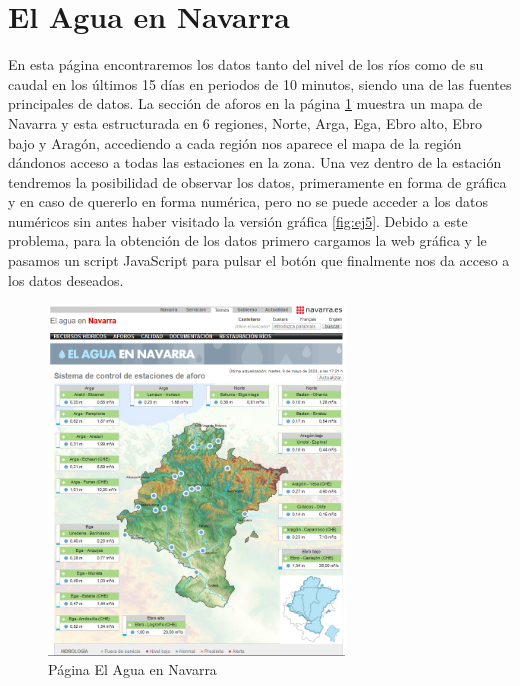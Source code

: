 \section{El Agua en Navarra}
En esta página encontraremos los datos tanto del nivel de los ríos como de su caudal en los últimos 15 días en periodos de 10 minutos, siendo una de las fuentes principales de datos.
\newline
\newline
La sección de aforos en la página \ref{fig:ej4} muestra un mapa de Navarra y esta estructurada en 6 regiones, Norte, Arga, Ega, Ebro alto, Ebro bajo y Aragón, accediendo a cada región nos aparece el mapa de la región dándonos acceso a todas las estaciones en la zona.
\newline
\newline
Una vez dentro de la estación tendremos la posibilidad de observar los datos, primeramente en forma de gráfica y en caso de quererlo en forma numérica, pero no se puede acceder a los datos numéricos sin antes haber visitado la versión gráfica \ref{fig:ej5}.
\newline
\newline
Debido a este problema, para la obtención de los datos primero cargamos la web gráfica y le pasamos un script JavaScript para pulsar el botón que finalmente nos da acceso a los datos deseados.

\begin{figure} [h!]
	\centering
	\includegraphics[width=0.7\textwidth]{fig/AguaEnNavarra.png}
	\caption[Página principal de aforos de El Agua en Navarra]{Página El Agua en Navarra}
	\label{fig:ej4}
\end{figure}

